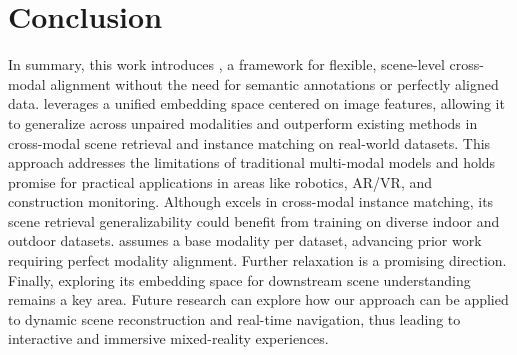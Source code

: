 \section{Conclusion}
\label{sec:conclusion}
In summary, this work introduces \project{}, a framework for flexible, scene-level cross-modal alignment without the need for semantic annotations or perfectly aligned data. \project{} leverages a unified embedding space centered on image features, allowing it to generalize across unpaired modalities and outperform existing methods in cross-modal scene retrieval and instance matching on real-world datasets. This approach addresses the limitations of traditional multi-modal models and holds promise for practical applications in areas like robotics, AR/VR, and construction monitoring.  Although \project{} excels in cross-modal instance matching, its scene retrieval generalizability could benefit from training on diverse indoor and outdoor datasets. \project{} assumes a base modality per dataset, advancing prior work requiring perfect modality alignment. Further relaxation is a promising direction. Finally, exploring its embedding space for downstream scene understanding remains a key area. Future research can explore how our approach can be applied to dynamic scene reconstruction and real-time navigation, thus leading to interactive and immersive mixed-reality experiences. 